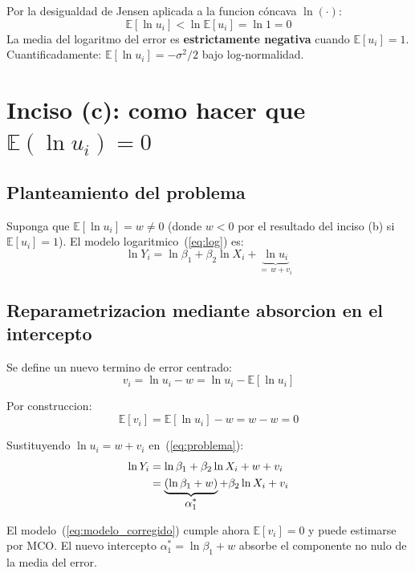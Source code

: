 \documentclass[12pt, letterpaper]{article}
\theoremstyle{remark}
\newcommand{\E}{\mathbb{E}}
\begin{document}
\begin{clave}
  Por la desigualdad de Jensen aplicada a la funcion cóncava $\ln(\cdot)$:
  \[
    \E[\ln u_i] < \ln \E[u_i] = \ln 1 = 0
  \]
  La media del logaritmo del error es \textbf{estrictamente negativa} cuando
  $\E[u_i] = 1$. Cuantificadamente: $\E[\ln u_i] = -\sigma^2/2$ bajo log-normalidad.
\end{clave}

\section{Inciso (c): como hacer que $\E(\ln u_i) = 0$}

\subsection{Planteamiento del problema}

Suponga que $\E[\ln u_i] = w \neq 0$ (donde $w < 0$ por el resultado del
inciso (b) si $\E[u_i] = 1$). El modelo logaritmico~(\ref{eq:log}) es:
\begin{equation}
  \ln Y_i = \ln\beta_1 + \beta_2 \ln X_i + \underbrace{\ln u_i}_{=\,w + v_i}
  \label{eq:problema}
\end{equation}

\subsection{Reparametrizacion mediante absorcion en el intercepto}

Se define un nuevo termino de error centrado:
\begin{equation}
  v_i = \ln u_i - w = \ln u_i - \E[\ln u_i]
  \label{eq:vi_def}
\end{equation}

Por construccion:
\begin{equation}
  \E[v_i] = \E[\ln u_i] - w = w - w = 0
  \label{eq:vi_media_cero}
\end{equation}

Sustituyendo $\ln u_i = w + v_i$ en~(\ref{eq:problema}):
\begin{align}
  \ln Y_i
  &= \ln\beta_1 + \beta_2 \ln X_i + w + v_i
  \notag\\
  &= \underbrace{(\ln\beta_1 + w)}_{\displaystyle\alpha_1^*}
   + \beta_2 \ln X_i + v_i
  \label{eq:modelo_corregido}
\end{align}

El modelo~(\ref{eq:modelo_corregido}) cumple ahora $\E[v_i] = 0$ y puede
estimarse por MCO. El nuevo intercepto $\alpha_1^* = \ln\beta_1 + w$ absorbe
el componente no nulo de la media del error.
\end{document}
